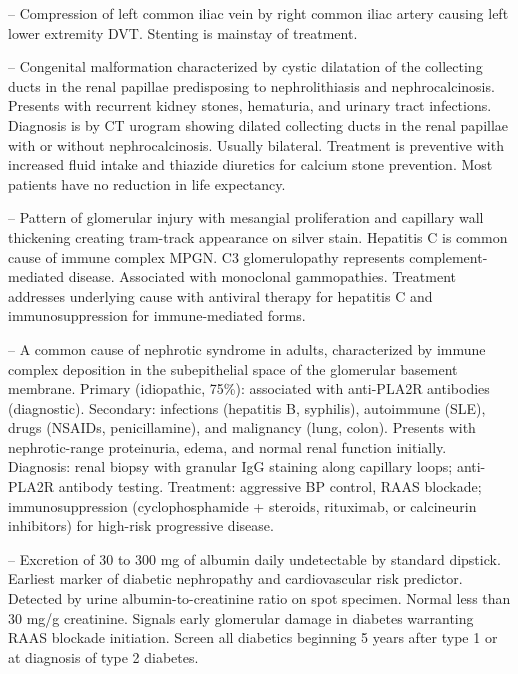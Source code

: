 -- Compression of left common iliac vein by right common iliac artery causing left lower extremity DVT. Stenting is mainstay of treatment.

-- Congenital malformation characterized by cystic dilatation of the collecting ducts in the renal papillae predisposing to nephrolithiasis and nephrocalcinosis. Presents with recurrent kidney stones, hematuria, and urinary tract infections. Diagnosis is by CT urogram showing dilated collecting ducts in the renal papillae with or without nephrocalcinosis. Usually bilateral. Treatment is preventive with increased fluid intake and thiazide diuretics for calcium stone prevention. Most patients have no reduction in life expectancy.

-- Pattern of glomerular injury with mesangial proliferation and capillary wall thickening creating tram-track appearance on silver stain. Hepatitis C is common cause of immune complex MPGN. C3 glomerulopathy represents complement-mediated disease. Associated with monoclonal gammopathies. Treatment addresses underlying cause with antiviral therapy for hepatitis C and immunosuppression for immune-mediated forms.

-- A common cause of nephrotic syndrome in adults, characterized by immune complex deposition in the subepithelial space of the glomerular basement membrane. Primary (idiopathic, 75\%): associated with anti-PLA2R antibodies (diagnostic). Secondary: infections (hepatitis B, syphilis), autoimmune (SLE), drugs (NSAIDs, penicillamine), and malignancy (lung, colon). Presents with nephrotic-range proteinuria, edema, and normal renal function initially. Diagnosis: renal biopsy with granular IgG staining along capillary loops; anti-PLA2R antibody testing. Treatment: aggressive BP control, RAAS blockade; immunosuppression (cyclophosphamide + steroids, rituximab, or calcineurin inhibitors) for high-risk progressive disease.

-- Excretion of 30 to 300 mg of albumin daily undetectable by standard dipstick. Earliest marker of diabetic nephropathy and cardiovascular risk predictor. Detected by urine albumin-to-creatinine ratio on spot specimen. Normal less than 30 mg/g creatinine. Signals early glomerular damage in diabetes warranting RAAS blockade initiation. Screen all diabetics beginning 5 years after type 1 or at diagnosis of type 2 diabetes.

